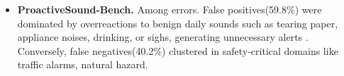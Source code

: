 \documentclass{llmxive}
\begin{document}
\begin{itemize}[leftmargin=0.5em,label=\textbullet,itemsep=0.35em,topsep=0.35em]
    \item \textbf{ProactiveSound-Bench.}
    Among errors. False positives(59.8\%) were dominated by overreactions to benign daily sounds such as tearing paper, appliance noises, drinking, or sighs, generating unnecessary alerts . Conversely, false negatives(40.2\%) clustered in safety‑critical domains like traffic alarms, natural hazard.

\end{itemize}



% 












\end{document}
